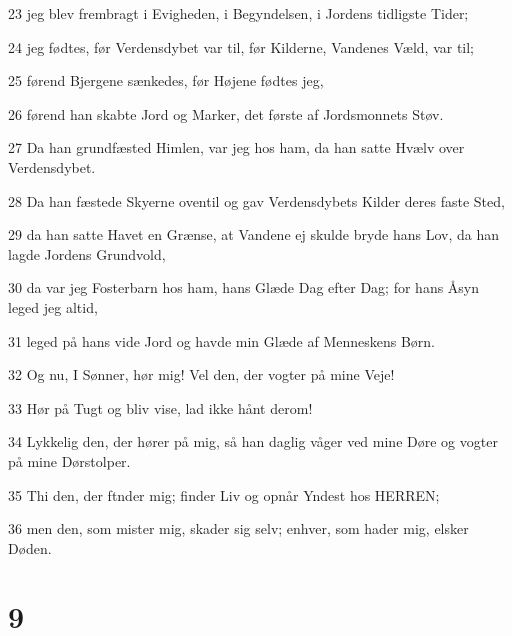 \par 23 jeg blev frembragt i Evigheden, i Begyndelsen, i Jordens tidligste Tider;
\par 24 jeg fødtes, før Verdensdybet var til, før Kilderne, Vandenes Væld, var til;
\par 25 førend Bjergene sænkedes, før Højene fødtes jeg,
\par 26 førend han skabte Jord og Marker, det første af Jordsmonnets Støv.
\par 27 Da han grundfæsted Himlen, var jeg hos ham, da han satte Hvælv over Verdensdybet.
\par 28 Da han fæstede Skyerne oventil og gav Verdensdybets Kilder deres faste Sted,
\par 29 da han satte Havet en Grænse, at Vandene ej skulde bryde hans Lov, da han lagde Jordens Grundvold,
\par 30 da var jeg Fosterbarn hos ham, hans Glæde Dag efter Dag; for hans Åsyn leged jeg altid,
\par 31 leged på hans vide Jord og havde min Glæde af Menneskens Børn.
\par 32 Og nu, I Sønner, hør mig! Vel den, der vogter på mine Veje!
\par 33 Hør på Tugt og bliv vise, lad ikke hånt derom!
\par 34 Lykkelig den, der hører på mig, så han daglig våger ved mine Døre og vogter på mine Dørstolper.
\par 35 Thi den, der ftnder mig; finder Liv og opnår Yndest hos HERREN;
\par 36 men den, som mister mig, skader sig selv; enhver, som hader mig, elsker Døden.

\chapter{9}

